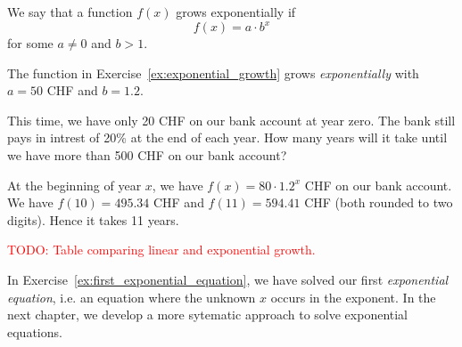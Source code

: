 \begin{tcolorbox}
	We say that a function $f\left(x\right)$ grows exponentially if
	\begin{equation*}
		f\left(x\right)=a\cdot b^x
	\end{equation*}
	for some $a\neq 0$ and $b>1$.
\end{tcolorbox}
\begin{example}
	The function in Exercise~\ref{ex:exponential_growth} grows \textit{exponentially} with $a=50$ CHF and $b=1.2$.
\end{example}
\begin{exercise} \label{ex:first_exponential_equation}
	This time, we have only 20 CHF on our bank account at year zero.
	The bank still pays in intrest of 20\% at the end of each year.
	How many years will it take until we have more than 500 CHF on our bank account?
\end{exercise}
\begin{solution*}
	At the beginning of year $x$, we have $f\left(x\right)=80\cdot 1.2^x$ CHF on our bank account.
	We have $f\left(10\right)=495.34$ CHF and $f\left(11\right)=594.41$ CHF (both rounded to two digits).
	Hence it takes 11 years.
\end{solution*}
\textcolor{red}{TODO: Table comparing linear and exponential growth.}

In Exercise~\ref{ex:first_exponential_equation}, we have solved our first \textit{exponential equation}, i.e. an equation where the unknown $x$ occurs in the exponent.
In the next chapter, we develop a more sytematic approach to solve exponential equations.